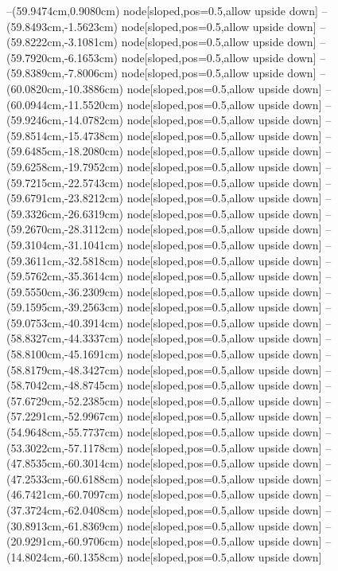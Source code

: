 --(59.9474cm,0.9080cm) node[sloped,pos=0.5,allow upside down]{\ArrowIn}
--(59.8493cm,-1.5623cm) node[sloped,pos=0.5,allow upside down]{\ArrowIn}
--(59.8222cm,-3.1081cm) node[sloped,pos=0.5,allow upside down]{\ArrowIn}
--(59.7920cm,-6.1653cm) node[sloped,pos=0.5,allow upside down]{\ArrowIn}
--(59.8389cm,-7.8006cm) node[sloped,pos=0.5,allow upside down]{\ArrowIn}
--(60.0820cm,-10.3886cm) node[sloped,pos=0.5,allow upside down]{\ArrowIn}
--(60.0944cm,-11.5520cm) node[sloped,pos=0.5,allow upside down]{\ArrowIn}
--(59.9246cm,-14.0782cm) node[sloped,pos=0.5,allow upside down]{\ArrowIn}
--(59.8514cm,-15.4738cm) node[sloped,pos=0.5,allow upside down]{\ArrowIn}
--(59.6485cm,-18.2080cm) node[sloped,pos=0.5,allow upside down]{\ArrowIn}
--(59.6258cm,-19.7952cm) node[sloped,pos=0.5,allow upside down]{\ArrowIn}
--(59.7215cm,-22.5743cm) node[sloped,pos=0.5,allow upside down]{\ArrowIn}
--(59.6791cm,-23.8212cm) node[sloped,pos=0.5,allow upside down]{\ArrowIn}
--(59.3326cm,-26.6319cm) node[sloped,pos=0.5,allow upside down]{\ArrowIn}
--(59.2670cm,-28.3112cm) node[sloped,pos=0.5,allow upside down]{\ArrowIn}
--(59.3104cm,-31.1041cm) node[sloped,pos=0.5,allow upside down]{\ArrowIn}
--(59.3611cm,-32.5818cm) node[sloped,pos=0.5,allow upside down]{\ArrowIn}
--(59.5762cm,-35.3614cm) node[sloped,pos=0.5,allow upside down]{\ArrowIn}
--(59.5550cm,-36.2309cm) node[sloped,pos=0.5,allow upside down]{\arrowIn}
--(59.1595cm,-39.2563cm) node[sloped,pos=0.5,allow upside down]{\ArrowIn}
--(59.0753cm,-40.3914cm) node[sloped,pos=0.5,allow upside down]{\ArrowIn}
--(58.8327cm,-44.3337cm) node[sloped,pos=0.5,allow upside down]{\ArrowIn}
--(58.8100cm,-45.1691cm) node[sloped,pos=0.5,allow upside down]{\arrowIn}
--(58.8179cm,-48.3427cm) node[sloped,pos=0.5,allow upside down]{\ArrowIn}
--(58.7042cm,-48.8745cm) node[sloped,pos=0.5,allow upside down]{\arrowIn}
--(57.6729cm,-52.2385cm) node[sloped,pos=0.5,allow upside down]{\ArrowIn}
--(57.2291cm,-52.9967cm) node[sloped,pos=0.5,allow upside down]{\arrowIn}
--(54.9648cm,-55.7737cm) node[sloped,pos=0.5,allow upside down]{\ArrowIn}
--(53.3022cm,-57.1178cm) node[sloped,pos=0.5,allow upside down]{\ArrowIn}
--(47.8535cm,-60.3014cm) node[sloped,pos=0.5,allow upside down]{\ArrowIn}
--(47.2533cm,-60.6188cm) node[sloped,pos=0.5,allow upside down]{\arrowIn}
--(46.7421cm,-60.7097cm) node[sloped,pos=0.5,allow upside down]{\arrowIn}
--(37.3724cm,-62.0408cm) node[sloped,pos=0.5,allow upside down]{\ArrowIn}
--(30.8913cm,-61.8369cm) node[sloped,pos=0.5,allow upside down]{\ArrowIn}
--(20.9291cm,-60.9706cm) node[sloped,pos=0.5,allow upside down]{\ArrowIn}
--(14.8024cm,-60.1358cm) node[sloped,pos=0.5,allow upside down]{\ArrowIn}
